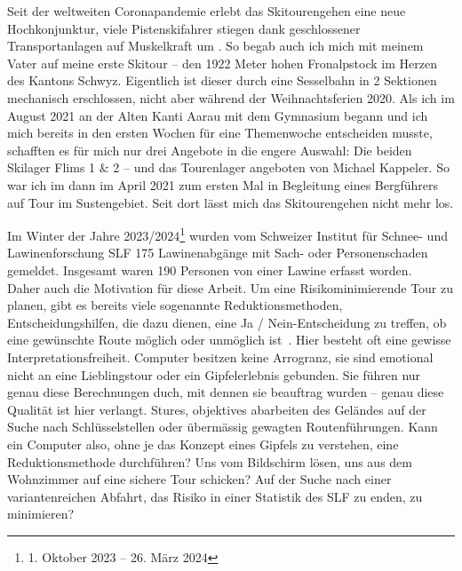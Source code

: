 \begin{multicols}{2}



Seit der weltweiten Coronapandemie erlebt das Skitourengehen eine neue Hochkonjunktur, viele Pistenskifahrer stiegen dank geschlossener Transportanlagen auf Muskelkraft um \cite{sacCoronaTrend}. So begab auch ich mich mit meinem Vater auf meine erste Skitour – den 1922 Meter hohen Fronalpstock im Herzen des Kantons Schwyz. Eigentlich ist dieser durch eine Sesselbahn in 2 Sektionen mechanisch erschlossen, nicht aber während der Weihnachtsferien 2020.
Als ich im August 2021 an der Alten Kanti Aarau mit dem Gymnasium begann und ich mich bereits in den ersten Wochen für eine Themenwoche entscheiden musste, schafften es für mich nur drei Angebote in die engere Auswahl: Die beiden Skilager Flims 1 \& 2 – und das Tourenlager angeboten von Michael Kappeler. So war ich im dann im April 2021 zum ersten Mal in Begleitung eines Bergführers auf Tour im Sustengebiet. Seit dort lässt mich das Skitourengehen nicht mehr los.

Im Winter der Jahre 2023/2024\footnote{1. Oktober 2023 -- 26. März 2024} wurden vom Schweizer Institut für Schnee- und Lawinenforschung SLF 175 Lawinenabgänge mit Sach- oder Personenschaden gemeldet. Insgesamt waren 190 Personen von einer Lawine erfasst worden.~\cite{slfWinterbericht202324}
\vfill\null
\columnbreak
Daher auch die Motivation für diese Arbeit. Um eine Risikominimierende Tour zu planen, gibt es bereits viele sogenannte Reduktionsmethoden, Entscheidungshilfen, die dazu dienen, eine Ja / Nein-Entscheidung zu treffen, ob eine gewünschte Route möglich oder unmöglich ist~\cite{skitourenguruReduktionsmethoden}.
Hier besteht oft eine gewisse Interpretationsfreiheit. Computer besitzen keine Arrogranz, sie sind emotional nicht an eine Lieblingstour oder ein Gipfelerlebnis gebunden. Sie führen nur genau diese Berechnungen duch, mit dennen sie beauftrag wurden – genau diese Qualität ist hier verlangt. Stures, objektives abarbeiten des Geländes auf der Suche nach Schlüsselstellen oder übermässig gewagten Routenführungen. Kann ein Computer also, ohne je das Konzept eines Gipfels zu verstehen, eine Reduktionsmethode durchführen? Uns vom Bildschirm lösen, uns aus dem Wohnzimmer auf eine sichere Tour schicken? 
Auf der Suche nach einer variantenreichen Abfahrt, das Risiko in einer Statistik des SLF zu enden, zu minimieren?


\end{multicols}
